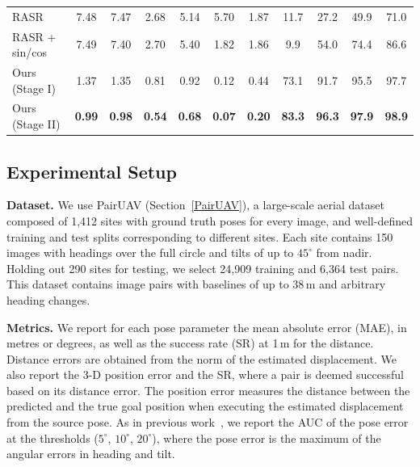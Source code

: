 \begin{table}[!t]
\begin{tabular}{l|cccccc|c|ccc}
        RASR~\citep{liang2026rasr} & 7.48 & 7.47 & 2.68 & 5.14 & 5.70 & 1.87 & 11.7 & 27.2 & 49.9 & 71.0 \\
        RASR + sin/cos & 7.49 & 7.40 & 2.70 & 5.40 & 1.82 & 1.86 & 9.9 & 54.0 & 74.4 & 86.6 \\
        \midrule
        Ours (Stage I)  & 1.37 & 1.35 & 0.81 & 0.92 & 0.12 & 0.44 & 73.1 & 91.7 & 95.5 & 97.7 \\
        Ours (Stage II) & \textbf{0.99} & \textbf{0.98} & \textbf{0.54} & \textbf{0.68} & \textbf{0.07} & \textbf{0.20} & \textbf{83.3} & \textbf{96.3} & \textbf{97.9} & \textbf{98.9} \\
        \bottomrule
    \end{tabular}
\end{table}

\subsection{Experimental Setup}
\label{sec:setup}

\noindent \textbf{Dataset.} We use PairUAV (Section~\ref{PairUAV}), a large-scale aerial dataset composed of 1,412 sites with ground truth poses for every image, and well-defined training and test splits corresponding to different sites. Each site contains 150 images with headings over the full circle and tilts of up to $45^\circ$ from nadir. Holding out 290 sites for testing, we select 24,909 training and 6,364 test pairs. This dataset contains image pairs with baselines of up to 38\,m and arbitrary heading changes.

\noindent \textbf{Metrics.} We report for each pose parameter the mean absolute error (MAE), in metres or degrees, as well as the success rate (SR) at 1\,m for the distance. Distance errors are obtained from the norm of the estimated displacement. We also report the 3-D position error and the SR, where a pair is deemed successful based on its distance error. The position error measures the distance between the predicted and the true goal position when executing the estimated displacement from the source pose. As in previous work~\citep{sarlin2020superglue,sun2021loftr}, we report the AUC of the pose error at the thresholds ($5^\circ$, $10^\circ$, $20^\circ$), where the pose error is the maximum of the angular errors in heading and tilt.

